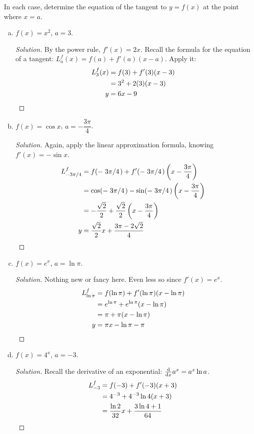 \documentclass{agony}
\begin{document}
\question In each case, determine the equation of the tangent to $y=f(x)$ at the point where $x=a$.
\begin{enumerate}[(a)]
  \item $f(x)=x^2$, $a=3$.
        \begin{proof}[Solution]
          By the power rule, $f'(x) = 2x$.
          Recall the formula for the equation of a tangent: $L_a^f(x)=f(a)+f'(a)(x-a)$.
          Apply it:
          \begin{align*}
            L_3^f(x) & = f(3)+f'(3)(x-3) \\
                     & = 3^2 + 2(3)(x-3) \\
            y        & = 6x - 9 \qedhere
          \end{align*}
        \end{proof}
  \item $f(x)=\cos x$, $a=-\dfrac{3\pi}{4}$.
        \begin{proof}[Solution]
          Again, apply the linear approximation formula, knowing $f'(x)=-\sin x$.
          \begin{align*}
            L_{-3\pi/4}^f
              & = f(-\flatfrac{3\pi}{4}) + f'(-\flatfrac{3\pi}{4})\left(x-\frac{3\pi}{4}\right)      \\
              & = \cos(-\flatfrac{3\pi}{4}) - \sin(-\flatfrac{3\pi}{4})\left(x-\frac{3\pi}{4}\right) \\
              & = -\frac{\sqrt{2}}{2} + \frac{\sqrt{2}}{2}\left(x-\frac{3\pi}{4}\right)              \\
            y & = \frac{\sqrt{2}}{2}x + \frac{3\pi-2\sqrt{2}}{4} \qedhere
          \end{align*}
        \end{proof}
  \item $f(x)=e^x$, $a=\ln\pi$.
        \begin{proof}[Solution]
          Nothing new or fancy here. Even less so since $f'(x)=e^x$.
          \begin{align*}
            L_{\ln\pi}^f & = f(\ln\pi) + f'(\ln\pi)(x-\ln\pi)  \\
                         & = e^{\ln\pi} + e^{\ln\pi}(x-\ln\pi) \\
                         & = \pi + \pi(x-\ln\pi)               \\
            y            & = \pi x - \ln\pi - \pi \qedhere
          \end{align*}
        \end{proof}
  \item $f(x)=4^x$, $a=-3$.
        \begin{proof}[Solution]
          Recall the derivative of an exponential: $\dv{x}a^x = a^x\ln a$.
          \begin{align*}
            L_{-3}^f & = f(-3) + f'(-3)(x+3)                              \\
                     & = 4^{-3} + 4^{-3}\ln 4(x+3)                        \\
                     & = \frac{\ln 2}{32}x + \frac{3\ln 4+1}{64} \qedhere
          \end{align*}
        \end{proof}
\end{enumerate}
\end{document}
